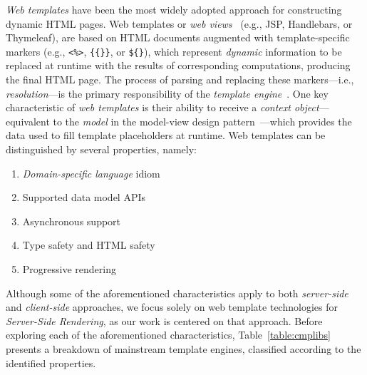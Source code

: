 \documentclass[software,article,accept,pdftex,moreauthors]{Definitions/mdpi}
\begin{document}
\textit{Web templates} have been the most widely adopted approach for
constructing dynamic HTML pages.
Web templates or \textit{web views}~\cite{Fowler02,Alur01} (e.g., JSP, Handlebars,
or Thymeleaf), are based on HTML documents augmented with template-specific
markers (e.g., \texttt{<\%>}, \texttt{\{\{\}\}}, or \texttt{\$\{\}}), which
represent \textit{dynamic} information to be replaced at runtime with the
results of corresponding computations, producing the final HTML page.
The process of parsing and replacing these markers---i.e.,
\textit{resolution}---is the primary responsibility of the \textit{template
  engine}~\cite{Parr04}.
One key characteristic of \textit{web templates} is their ability to receive a
\textit{context object}---equivalent to the \textit{model} in the model-view
design pattern~\cite{mvc88,Parr04}---which provides the data used to fill
template placeholders at runtime.
Web templates can be distinguished by several properties, namely:
\begin{enumerate}
  \item \textit{Domain-specific language} idiom
  \item Supported data model APIs
  \item Asynchronous support
  \item Type safety and HTML safety
  \item Progressive rendering
\end{enumerate}

Although some of the aforementioned characteristics apply to both
\textit{server-side} and \textit{client-side} approaches, we focus solely on
web template technologies for \textit{Server-Side Rendering}, as our work is
centered on that approach. Before exploring each of the aforementioned
characteristics, Table~\ref{table:cmplibs} presents a breakdown of mainstream
template engines, classified according to the identified properties.
\end{document}
